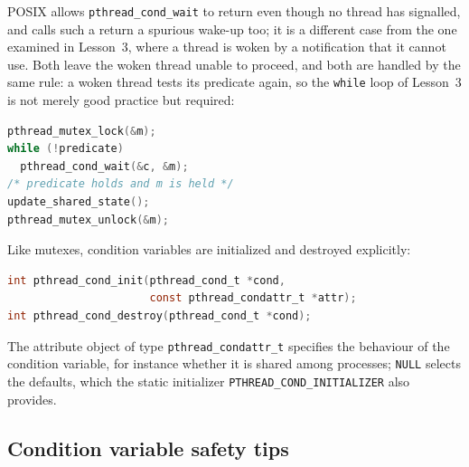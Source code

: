 \documentclass[../main.tex]{subfiles}
\begin{document}
POSIX allows \texttt{pthread\_cond\_wait} to return even though no thread
has signalled, and calls such a return a spurious wake-up
too; it is a different case from the one examined in
Lesson~3, where a thread is woken by a notification that it cannot use.
Both leave the woken thread unable to proceed, and both are handled by the
same rule: a woken thread tests its predicate again, so the \texttt{while}
loop of Lesson~3 is not merely good practice but required:
\begin{lstlisting}[language=C, numbers=none]
pthread_mutex_lock(&m);
while (!predicate)
  pthread_cond_wait(&c, &m);
/* predicate holds and m is held */
update_shared_state();
pthread_mutex_unlock(&m);
\end{lstlisting}

Like mutexes, condition variables are initialized and destroyed
explicitly:
\begin{lstlisting}[language=C, numbers=none]
int pthread_cond_init(pthread_cond_t *cond,
                      const pthread_condattr_t *attr);
int pthread_cond_destroy(pthread_cond_t *cond);
\end{lstlisting}
The attribute object of type \texttt{pthread\_condattr\_t} specifies the
behaviour of the condition variable, for instance whether it is shared among
processes; \texttt{NULL} selects the defaults, which the static initializer
\texttt{PTHREAD\_COND\_INITIALIZER} also provides.

\subsection{Condition variable safety tips}
\end{document}

